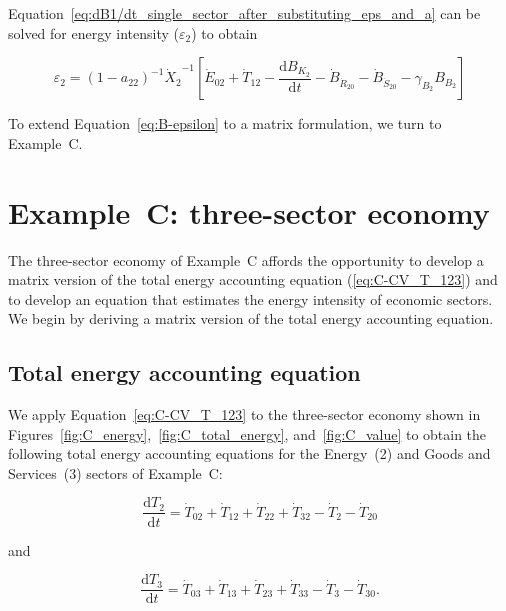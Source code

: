 Equation~\ref{eq:dB1/dt_single_sector_after_substituting_eps_and_a}
can be solved for energy intensity ($\varepsilon_{2}$) to obtain

\begin{equation} \label{eq:B-epsilon}
	\varepsilon_{2}
	= {(1 - a_{22})}^{-1} {\dot{X}_{2}}^{-1} 
		\left[
			\dot{E}_{02}
			+ \dot{T}_{12}
			- \frac{\mathrm{d}B_{K_{2}}}{\mathrm{d}t} 
			- \dot{B}_{\dot{R}_{20}}
			- \dot{B}_{\dot{S}_{20}}
			- \gamma_{B_{2}} B_{B_{2}}
		\right]
\end{equation}

To extend Equation~\ref{eq:B-epsilon}
to a matrix formulation, we turn to Example~C.


\section{Example~C: three-sector economy} %
\label{sec:C-intensity}

The three-sector economy of Example~C affords the opportunity 
to develop a matrix version 
of the total energy accounting equation (\ref{eq:C-CV_T_123})
and to develop an equation that estimates the
energy intensity of economic sectors. 
We begin by deriving a matrix version of the total energy accounting equation.


\subsection{Total energy accounting equation}

We apply Equation~\ref{eq:C-CV_T_123} to the three-sector
economy shown in 
Figures~\ref{fig:C_energy},~\ref{fig:C_total_energy}, and~\ref{fig:C_value}
to obtain the following total energy accounting equations
for the Energy~(2) and Goods and Services~(3) sectors 
of Example~C: %

\begin{equation} \label{eq:C-Total_Energy_Sec_2-a}
	\frac{\mathrm{d}T_{2}}{\mathrm{d}t} 
	= \dot{T}_{02}  
	+ \dot{T}_{12}
	+ \dot{T}_{22}
	+ \dot{T}_{32}
	- \dot{T}_{2}
	- \dot{T}_{20}
\end{equation}

\noindent{}and

\begin{equation} \label{eq:C-Total_Energy_Sec_3-a}
	\frac{\mathrm{d}T_{3}}{\mathrm{d}t} 
	= \dot{T}_{03}  
	+ \dot{T}_{13}
	+ \dot{T}_{23}
	+ \dot{T}_{33}
	- \dot{T}_{3}
	- \dot{T}_{30}.
\end{equation}


